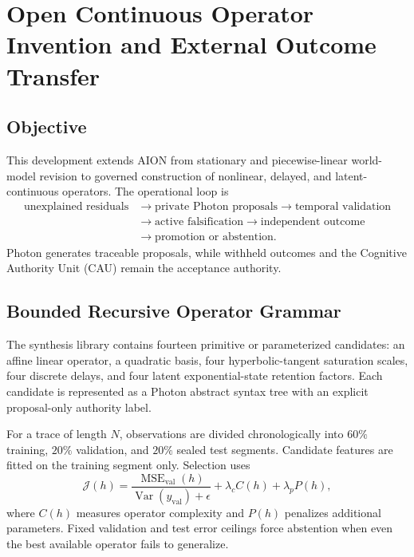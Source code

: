 \section{Open Continuous Operator Invention and External Outcome Transfer}
\label{sec:open-continuous-operator-invention}

\subsection{Objective}

This development extends AION from stationary and piecewise-linear world-model
revision to governed construction of nonlinear, delayed, and latent-continuous
operators. The operational loop is
\[
\begin{aligned}
\text{unexplained residuals}
&\rightarrow \text{private Photon proposals}
\rightarrow \text{temporal validation}\\
&\rightarrow \text{active falsification}
\rightarrow \text{independent outcome}\\
&\rightarrow \text{promotion or abstention}.
\end{aligned}
\]
Photon generates traceable proposals, while withheld outcomes and the
Cognitive Authority Unit (CAU) remain the acceptance authority.

\subsection{Bounded Recursive Operator Grammar}

The synthesis library contains fourteen primitive or parameterized candidates:
an affine linear operator, a quadratic basis, four hyperbolic-tangent
saturation scales, four discrete delays, and four latent exponential-state
retention factors. Each candidate is represented as a Photon abstract syntax
tree with an explicit proposal-only authority label.

For a trace of length \(N\), observations are divided chronologically into
\(60\%\) training, \(20\%\) validation, and \(20\%\) sealed test segments.
Candidate features are fitted on the training segment only. Selection uses
\[
\mathcal{J}(h)
=
\frac{\operatorname{MSE}_{\mathrm{val}}(h)}
     {\operatorname{Var}(y_{\mathrm{val}})+\epsilon}
+\lambda_c C(h)+\lambda_p P(h),
\]
where \(C(h)\) measures operator complexity and \(P(h)\) penalizes additional
parameters. Fixed validation and test error ceilings force abstention when
even the best available operator fails to generalize.

